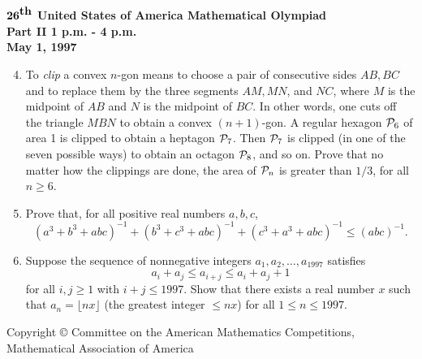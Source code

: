 \documentclass[12pt]{article}
\begin{document}
\newpage
\begin{center}
${\bf 26}^{\mbox{\bf th}}$ {\bf United States of America
Mathematical Olympiad} \\[.1in]
{\bf Part II \hspace{.25in} 1 p.m. - 4 p.m.}\\[.05in]
{\bf May 1, 1997}
\end{center}

\vspace*{.2in}

\begin{enumerate}
\setcounter{enumi}{3}

\item %
To {\em clip} a convex $n$-gon means to choose a pair of
consecutive sides $AB, BC$ and to replace them by the three
segments $AM, MN$, and $NC$, where $M$ is the midpoint of $AB$
and $N$ is the midpoint of $BC$.  In other words, one cuts off the
triangle $MBN$ to obtain a convex $(n+1)$-gon.  A regular hexagon
${\cal P}_6$ of area 1 is clipped to obtain a heptagon ${\cal
P}_7$.  Then ${\cal P}_7$ is clipped (in one of the seven possible
ways) to obtain an octagon ${\cal P}_8$, and so on.  Prove that no
matter how the clippings are done, the area of ${\cal P}_n$ is
greater than $1/3$, for all $n \geq 6$.

\item %
Prove that, for all positive real numbers $a,b,c$,
\[
(a^3 + b^3 + abc)^{-1} + (b^3 + c^3 + abc)^{-1} 
+ (c^3 + a^3 + abc)^{-1} \leq (abc)^{-1}.
\]

\item %
Suppose the sequence of nonnegative integers 
$a_1, a_2, \ldots, a_{1997}$ satisfies 
\[
a_i + a_j \leq a_{i+j} \leq a_i + a_j + 1
\]
for all $i,j \geq 1$ with $i + j \leq 1997$.  Show that there
exists a real number $x$ such that $a_n = \lfloor nx \rfloor$ 
(the greatest integer $\leq nx$) for all $1 \leq n \leq 1997$.


\end{enumerate}
\vspace*{\fill}
\begin{center}
{\footnotesize Copyright \copyright \hspace{.05in} Committee on
the American Mathematics Competitions, \\ 
Mathematical Association of America}
\end{center}
\end{document}
